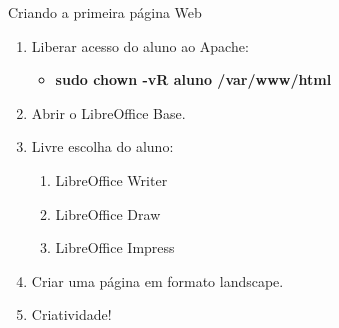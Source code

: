 {\Large Criando a primeira página Web}

\begin{enumerate}
	\item Liberar acesso do aluno ao Apache: \begin{itemize}
		\item \textbf{sudo chown -vR aluno /var/www/html}
	\end{itemize}
	\item Abrir o LibreOffice Base.
	\item Livre escolha do aluno:
	\begin{enumerate}
		\item LibreOffice Writer
		\item LibreOffice Draw
		\item LibreOffice Impress 
	\end{enumerate} 
	\item Criar uma página em formato landscape.
	\item Criatividade!
\end{enumerate}